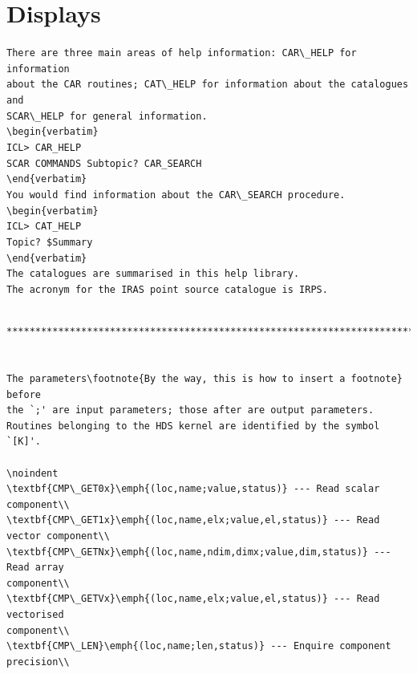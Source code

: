 \documentclass[twoside,11pt]{article}
\newcommand{\xlabel}[1]{}
\renewcommand{\_}{\texttt{\symbol{95}}}
\begin{document}
\newpage

\section{Displays\xlabel{displays}}

{\small
\verb+There are three main areas of help information: CAR\_HELP for information+\\
\verb+about the CAR routines; CAT\_HELP for information about the catalogues and +\\
\verb+SCAR\_HELP for general information.+\\
\verb+\begin{verbatim}+\\
\hspace*{10mm}\verb+ICL> CAR_HELP+\\
\hspace*{10mm}\verb+SCAR COMMANDS Subtopic? CAR_SEARCH+\\
\verb+\end{verbatim}+\\
\verb+You would find information about the CAR\_SEARCH procedure.+\\
\verb+\begin{verbatim}+\\
\hspace*{10mm}\verb+ICL> CAT_HELP+\\
\hspace*{10mm}\verb+Topic? $Summary+\\
\verb+\end{verbatim}+\\
\verb+The catalogues are summarised in this help library.+\\
\verb+The acronym for the IRAS point source catalogue is IRPS.+\\
\begin{verbatim}

******************************************************************************


The parameters\footnote{By the way, this is how to insert a footnote} before
the `;' are input parameters; those after are output parameters.
Routines belonging to the HDS kernel are identified by the symbol `[K]'.

\noindent
\textbf{CMP\_GET0x}\emph{(loc,name;value,status)} --- Read scalar component\\
\textbf{CMP\_GET1x}\emph{(loc,name,elx;value,el,status)} --- Read vector component\\
\textbf{CMP\_GETNx}\emph{(loc,name,ndim,dimx;value,dim,status)} --- Read array 
component\\
\textbf{CMP\_GETVx}\emph{(loc,name,elx;value,el,status)} --- Read vectorised 
component\\
\textbf{CMP\_LEN}\emph{(loc,name;len,status)} --- Enquire component precision\\



\end{verbatim}}
\end{document}
